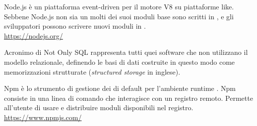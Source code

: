 Node.js è un piattaforma event-driven per il motore  V8 su piattaforme  like. Sebbene Node.js non sia un   molti dei suoi moduli base sono scritti in , e gli sviluppatori possono scrivere nuovi moduli in .\\
\url{https://nodejs.org/}

Acronimo di Not Only SQL rappresenta tutti quei software che non utilizzano il modello relazionale, definendo le basi di dati costruite in questo modo come memorizzazioni strutturate (\textit{structured storage} in inglese).

Npm è lo strumento di gestione dei  di default per l’ambiente runtime  . Npm consiste in una linea di comando che interagisce con un registro remoto. Permette all’utente di usare e distribuire moduli  disponibili nel registro.\\
\url{https://www.npmjs.com/}
\clearpage